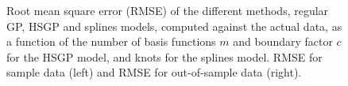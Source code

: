 \documentclass[onecolumn,a4paper,11pt]{article}
\begin{document}
\begin{figure}
\caption{Root mean square error (RMSE) of the different methods, regular GP, HSGP and splines models, computed against the actual data, as a function of the number of basis functions $m$ and boundary factor $c$ for the HSGP model, and knots for the splines model. RMSE for sample data (left) and RMSE for out-of-sample data (right).}
  \label{ch5_fig14_MSE_train_gaydata}
\end{figure}
\end{document}
